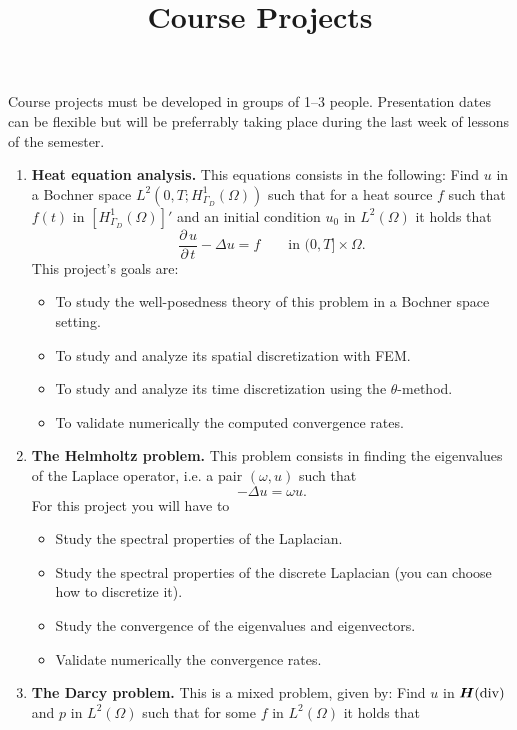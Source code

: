 \documentclass{article}
\title{Course Projects}
\date{}
\renewcommand{\vec}{\vectorsym}
\DeclareMathOperator{\dive}{\text{div}}
\newcommand{\parder}[2]{\frac{\partial\,#1}{\partial\,#2}}
\begin{document}
\maketitle
Course projects must be developed in groups of 1--3 people. Presentation dates can be flexible but will be preferrably taking place during the last week of lessons of the semester. 

\begin{enumerate}
    \item \textbf{Heat equation analysis.} This equations consists in the following: Find $u$ in a Bochner space $L^2(0,T;H_{\Gamma_D}^1(\Omega))$ such that for a heat source $f$ such that $f(t)$ in $[H_{\Gamma_D}^1(\Omega)]'$ and an initial condition $u_0$ in $L^2(\Omega)$ it holds that
        $$ \parder{u}{t} - \Delta u = f \qquad\text{in $(0,T]\times \Omega$}. $$
        This project's goals are:
        \begin{itemize}
            \item To study the well-posedness theory of this problem in a Bochner space setting.
            \item To study and analyze its spatial discretization with FEM.
            \item To study and analyze its time discretization using the $\theta$-method.
            \item To validate numerically the computed convergence rates.
        \end{itemize}
    \item \textbf{The Helmholtz problem.} This problem consists in finding the eigenvalues of the Laplace operator, i.e. a pair $(\omega, u)$ such that
        $$ -\Delta u = \omega u. $$
        For this project you will have to 
        \begin{itemize}
            \item Study the spectral properties of the Laplacian.
            \item Study the spectral properties of the discrete Laplacian (you can choose how to discretize it).
            \item Study the convergence of the eigenvalues and eigenvectors.
            \item Validate numerically the convergence rates.
        \end{itemize}
    \item \textbf{The Darcy problem.} This is a mixed problem, given by: Find $u$ in $\vec H(\dive)$ and $p$ in $L^2(\Omega)$ such that for some $f$ in $L^2(\Omega)$ it holds that

\end{enumerate}
\end{document}
